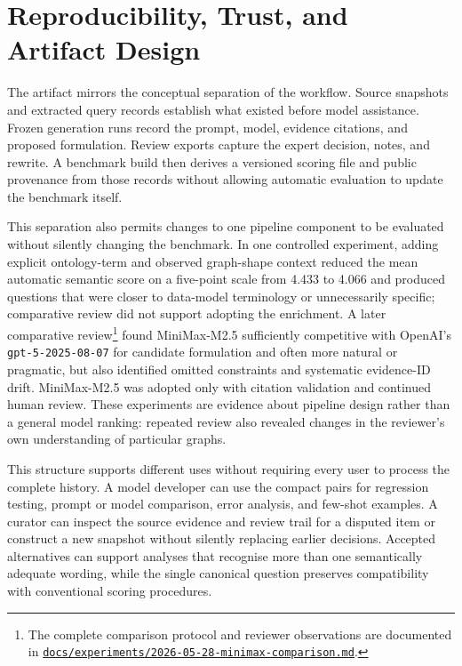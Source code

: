 \section{Reproducibility, Trust, and Artifact Design}\label{reproducibility-trust-and-artifact-design}

The artifact mirrors the conceptual separation of the workflow. Source snapshots and extracted query records establish what existed before model assistance. Frozen generation runs record the prompt, model, evidence citations, and proposed formulation. Review exports capture the expert decision, notes, and rewrite. A benchmark build then derives a versioned scoring file and public provenance from those records without allowing automatic evaluation to update the benchmark itself.

This separation also permits changes to one pipeline component to be evaluated without silently changing the benchmark. In one controlled experiment, adding explicit ontology-term and observed graph-shape context reduced the mean automatic semantic score on a five-point scale from 4.433 to 4.066 and produced questions that were closer to data-model terminology or unnecessarily specific; comparative review did not support adopting the enrichment. A later comparative review\footnote{The complete comparison protocol and reviewer observations are documented in \href{https://github.com/ppquadrat/musparql-aligner/blob/main/docs/experiments/2026-05-28-minimax-comparison.md}{\texttt{docs/experiments/2026-05-28-minimax-comparison.md}}.} found MiniMax-M2.5 sufficiently competitive with OpenAI's \texttt{gpt-5-2025-08-07} for candidate formulation and often more natural or pragmatic, but also identified omitted constraints and systematic evidence-ID drift. MiniMax-M2.5 was adopted only with citation validation and continued human review. These experiments are evidence about pipeline design rather than a general model ranking: repeated review also revealed changes in the reviewer's own understanding of particular graphs.

This structure supports different uses without requiring every user to process the complete history. A model developer can use the compact pairs for regression testing, prompt or model comparison, error analysis, and few-shot examples. A curator can inspect the source evidence and review trail for a disputed item or construct a new snapshot without silently replacing earlier decisions. Accepted alternatives can support analyses that recognise more than one semantically adequate wording, while the single canonical question preserves compatibility with conventional scoring procedures.

